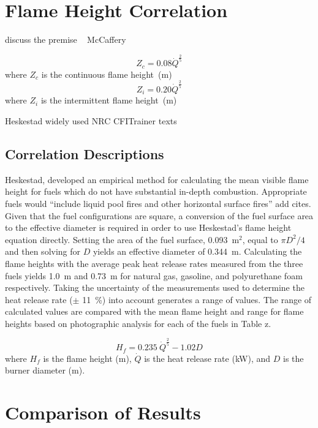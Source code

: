 \documentclass[twoside]{uocthesis}
\begin{document}
\section{Flame Height Correlation}

discuss the premise    ~\cite{McCaffrey:1979}
McCaffery

\begin{equation}\label{eq:z_c}
Z_c = 0.08 \dot{Q}^{\frac{2}{5}}
\end{equation}
where $Z_c$ is the continuous flame height~(m)
\begin{equation}\label{eq:z_i}
Z_i = 0.20 \dot{Q}^{\frac{2}{5}}
\end{equation}
where $Z_i$ is the intermittent flame height~(m)

Heskestad widely used  NRC CFITrainer  texts



\subsection{Correlation Descriptions}
Heskestad, developed an empirical method for calculating the mean visible flame height for fuels which do not have substantial in-depth combustion.  Appropriate fuels would ``include liquid pool fires and other horizontal surface fires'' add cites.  Given that the fuel configurations are square, a conversion of the fuel surface area to the effective diameter is required in order to use Heskestad's flame height equation directly.  Setting the area of the fuel surface, 0.093~m$^2$, equal to $\pi D^2/4$ and then solving for $D$ yields an effective diameter of 0.344~m.
Calculating the flame heights with the average peak heat release rates measured from the three fuels yields 1.0~m and 0.73~m for natural gas, gasoline, and polyurethane foam respectively. Taking the uncertainty of the measurements used to determine the heat release rate ($\pm$ 11~\%) into account generates a range of values.   The range of calculated values are compared with the mean flame height and range for flame heights  based on photographic analysis for each of the fuels in Table z.

\begin{equation}\label{eq:flame_height}
H_f = 0.235\: \dot{Q}^{\frac{2}{5}} - 1.02 D
\end{equation}
where $H_{f}$ is the flame height (m), $\dot{Q}$ is the heat release rate (kW), and $D$ is the burner diameter (m).


\section{Comparison of Results}
\end{document}
